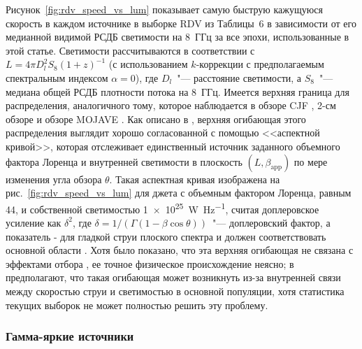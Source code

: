 Рисунок~\ref{fig:rdv_speed_vs_lum} показывает самую быструю кажущуюся скорость в каждом источнике в
выборке RDV из Таблицы~6 в зависимости от его медианной видимой РСДБ светимости на 8~ГГц за все
эпохи, использованные в этой статье. Светимости рассчитываются в соответствии с $L=4\pi
D_{l}^{2}S_{8}(1+z)^{-1}$ (с использованием $k$-коррекции с предполагаемым спектральным индексом
$\alpha = 0$), где $D_{l}$~"--- расстояние светимости, а $S_{8}$~"--- медиана общей РСДБ плотности
потока на 8~ГГц. Имеется верхняя граница для распределения, аналогичного тому, которое наблюдается в
обзоре CJF \cite{Vermeulen_1995}, 2-см обзоре \cite{Kellermann_2004} и обзоре MOJAVE
\cite{Lister_2009b}. Как описано в \cite{Cohen_2007}, верхняя огибающая этого распределения выглядит
хорошо согласованной с помощью <<аспектной кривой>>, которая отслеживает единственный источник
заданного объемного фактора Лоренца и внутренней светимости в плоскость $(L, \beta_\text{app})$ по
мере изменения угла обзора $\theta$. Такая аспектная кривая изображена на
рис.~\ref{fig:rdv_speed_vs_lum} для джета с объемным фактором Лоренца, равным 44, и собственной
светимостью \SI{1e25}{\watt\per\hertz}, считая доплеровское усиление как $\delta^{2}$, где $\delta =
1 / (\Gamma (1-\beta \cos \theta))$~"--- доплеровский фактор, а показатель - для гладкой струи
плоского спектра и должен соответствовать основной области \cite{Cohen_2007}. Хотя было показано,
что эта верхняя огибающая не связана с эффектами отбора \cite{Cohen_2007}, ее точное физическое
происхождение неясно; в \cite{Lister_2009b} предполагают, что такая огибающая может возникнуть из-за
внутренней связи между скоростью струи и светимостью в основной популяции, хотя статистика текущих
выборок не может полностью решить эту проблему.

\subsubsection{Гамма-яркие источники}

